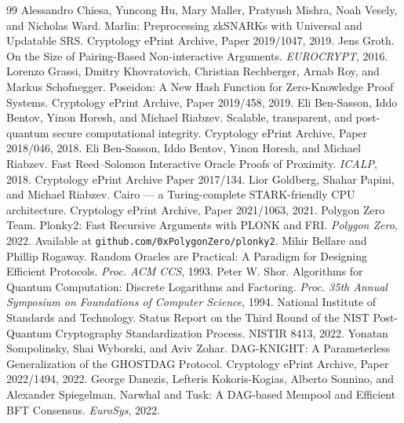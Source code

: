 \documentclass[11pt,a4paper]{article}
\begin{document}
\begin{thebibliography}{99}
 Alessandro Chiesa, Yuncong Hu, Mary Maller, Pratyush Mishra, Noah Vesely, and Nicholas Ward. Marlin: Preprocessing zkSNARKs with Universal and Updatable SRS. Cryptology ePrint Archive, Paper 2019/1047, 2019.
 Jens Groth. On the Size of Pairing-Based Non-interactive Arguments. \emph{EUROCRYPT}, 2016.
 Lorenzo Grassi, Dmitry Khovratovich, Christian Rechberger, Arnab Roy, and Markus Schofnegger. Poseidon: A New Hash Function for Zero-Knowledge Proof Systems. Cryptology ePrint Archive, Paper 2019/458, 2019.
 Eli Ben-Sasson, Iddo Bentov, Yinon Horesh, and Michael Riabzev. Scalable, transparent, and post-quantum secure computational integrity. Cryptology ePrint Archive, Paper 2018/046, 2018.
 Eli Ben-Sasson, Iddo Bentov, Yinon Horesh, and Michael Riabzev. Fast Reed--Solomon Interactive Oracle Proofs of Proximity. \emph{ICALP}, 2018. Cryptology ePrint Archive Paper 2017/134.
 Lior Goldberg, Shahar Papini, and Michael Riabzev. Cairo --- a Turing-complete STARK-friendly CPU architecture. Cryptology ePrint Archive, Paper 2021/1063, 2021.
 Polygon Zero Team. Plonky2: Fast Recursive Arguments with PLONK and FRI. \emph{Polygon Zero}, 2022. Available at \texttt{github.com/0xPolygonZero/plonky2}.
 Mihir Bellare and Phillip Rogaway. Random Oracles are Practical: A Paradigm for Designing Efficient Protocols. \emph{Proc. ACM CCS}, 1993.
 Peter W. Shor. Algorithms for Quantum Computation: Discrete Logarithms and Factoring. \emph{Proc. 35th Annual Symposium on Foundations of Computer Science}, 1994.
 National Institute of Standards and Technology. Status Report on the Third Round of the NIST Post-Quantum Cryptography Standardization Process. NISTIR 8413, 2022.
 Yonatan Sompolinsky, Shai Wyborski, and Aviv Zohar. DAG-KNIGHT: A Parameterless Generalization of the GHOSTDAG Protocol. Cryptology ePrint Archive, Paper 2022/1494, 2022.
 George Danezis, Lefteris Kokoris-Kogias, Alberto Sonnino, and Alexander Spiegelman. Narwhal and Tusk: A DAG-based Mempool and Efficient BFT Consensus. \emph{EuroSys}, 2022.
\end{thebibliography}
\end{document}
